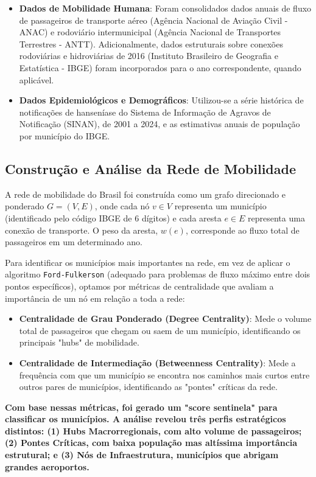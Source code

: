 \documentclass[preprint,12pt]{elsarticle}
\begin{document}
\begin{itemize}[label=\textbullet]
    \item \textbf{Dados de Mobilidade Humana}: Foram consolidados dados anuais de fluxo de passageiros de transporte aéreo (Agência Nacional de Aviação Civil - ANAC) e rodoviário intermunicipal (Agência Nacional de Transportes Terrestres - ANTT). Adicionalmente, dados estruturais sobre conexões rodoviárias e hidroviárias de 2016 (Instituto Brasileiro de Geografia e Estatística - IBGE) foram incorporados para o ano correspondente, quando aplicável.
    \item \textbf{Dados Epidemiológicos e Demográficos}: Utilizou-se a série histórica de notificações de hanseníase do Sistema de Informação de Agravos de Notificação (SINAN), de 2001 a 2024, e as estimativas anuais de população por município do IBGE.
\end{itemize}

\subsection{Construção e Análise da Rede de Mobilidade}
A rede de mobilidade do Brasil foi construída como um grafo direcionado e ponderado $G=(V, E)$, onde cada nó $v \in V$ representa um município (identificado pelo código IBGE de 6 dígitos) e cada aresta $e \in E$ representa uma conexão de transporte. O peso da aresta, $w(e)$, corresponde ao fluxo total de passageiros em um determinado ano.

Para identificar os municípios mais importantes na rede, em vez de aplicar o algoritmo \texttt{Ford-Fulkerson} (adequado para problemas de fluxo máximo entre dois pontos específicos), optamos por métricas de centralidade que avaliam a importância de um nó em relação a toda a rede:
\begin{itemize}[label=\textbullet]
    \item \textbf{Centralidade de Grau Ponderado (Degree Centrality)}: Mede o volume total de passageiros que chegam ou saem de um município, identificando os principais "hubs" de mobilidade.
    \item \textbf{Centralidade de Intermediação (Betweenness Centrality)}: Mede a frequência com que um município se encontra nos caminhos mais curtos entre outros pares de municípios, identificando as "pontes" críticas da rede.
\end{itemize}
\textbf{Com base nessas métricas, foi gerado um "score sentinela" para classificar os municípios. A análise revelou três perfis estratégicos distintos: (1) Hubs Macrorregionais, com alto volume de passageiros; (2) Pontes Críticas, com baixa população mas altíssima importância estrutural; e (3) Nós de Infraestrutura, municípios que abrigam grandes aeroportos.}
\end{document}
